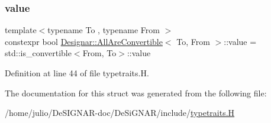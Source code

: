 \subsubsection{\texorpdfstring{value}{value}}
{\footnotesize\ttfamily template$<$typename To , typename From $>$ \\
constexpr bool \hyperlink{struct_designar_1_1_all_are_convertible}{Designar\+::\+All\+Are\+Convertible}$<$ To, From $>$\+::value = std\+::is\+\_\+convertible$<$From, To$>$\+::value\hspace{0.3cm}{\ttfamily [static]}}



Definition at line 44 of file typetraits.\+H.



The documentation for this struct was generated from the following file\+:\begin{DoxyCompactItemize}
\item 
/home/julio/\+De\+S\+I\+G\+N\+A\+R-\/doc/\+De\+Si\+G\+N\+A\+R/include/\hyperlink{typetraits_8_h}{typetraits.\+H}\end{DoxyCompactItemize}
